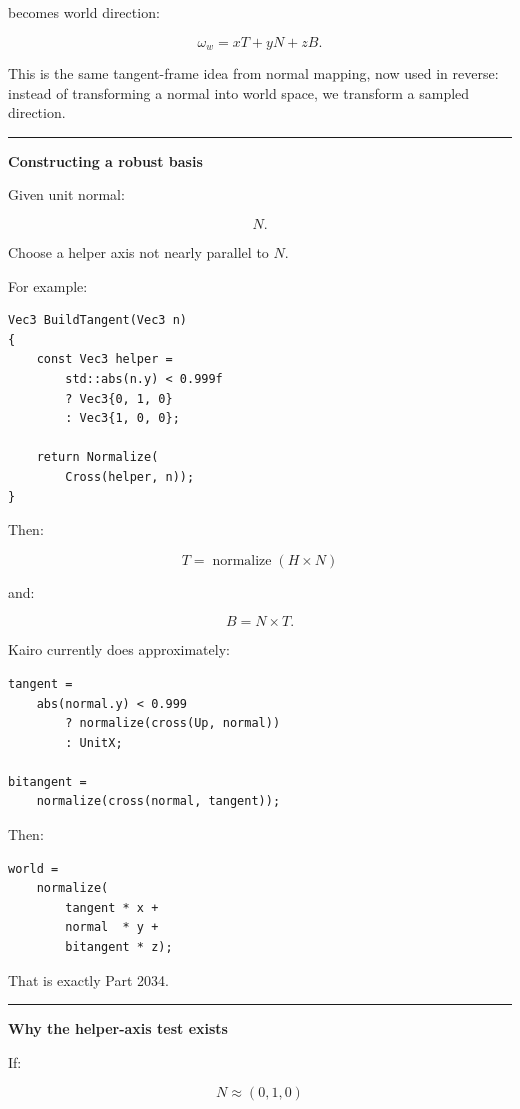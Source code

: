 becomes world direction:

\[
\boxed{
\omega_w
=
xT+
yN+
zB.
}
\]

This is the same tangent-frame idea from normal mapping, now used in reverse: instead of transforming a normal into world space, we transform a sampled direction.

\begin{center}\rule{0.5\linewidth}{0.5pt}\end{center}

\textbf{Constructing a robust basis}

Given unit normal:

\[
N.
\]

Choose a helper axis not nearly parallel to \(N\).

For example:

\begin{verbatim}
Vec3 BuildTangent(Vec3 n)
{
    const Vec3 helper =
        std::abs(n.y) < 0.999f
        ? Vec3{0, 1, 0}
        : Vec3{1, 0, 0};

    return Normalize(
        Cross(helper, n));
}
\end{verbatim}

Then:

\[
T=\operatorname{normalize}(H\times N)
\]

and:

\[
B=N\times T.
\]

Kairo currently does approximately:

\begin{verbatim}
tangent =
    abs(normal.y) < 0.999
        ? normalize(cross(Up, normal))
        : UnitX;

bitangent =
    normalize(cross(normal, tangent));
\end{verbatim}

Then:

\begin{verbatim}
world =
    normalize(
        tangent * x +
        normal  * y +
        bitangent * z);
\end{verbatim}

That is exactly Part 2034.

\begin{center}\rule{0.5\linewidth}{0.5pt}\end{center}

\textbf{Why the helper-axis test exists}

If:

\[
N\approx(0,1,0)
\]

